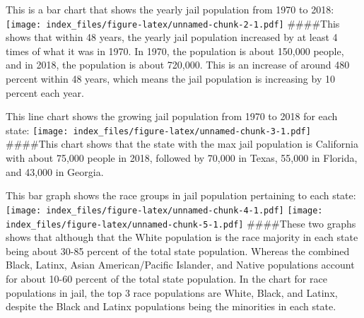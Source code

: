 \documentclass[
]{article}
\begin{document}
This is a bar chart that shows the yearly jail population from 1970 to
2018: \texttt{[image: index\_files/figure-latex/unnamed-chunk-2-1.pdf]}
\#\#\#\#This shows that within 48 years, the yearly jail population
increased by at least 4 times of what it was in 1970. In 1970, the
population is about 150,000 people, and in 2018, the population is about
720,000. This is an increase of around 480 percent within 48 years,
which means the jail population is increasing by 10 percent each year.

This line chart shows the growing jail population from 1970 to 2018 for
each state:
\texttt{[image: index\_files/figure-latex/unnamed-chunk-3-1.pdf]}
\#\#\#\#This chart shows that the state with the max jail population is
California with about 75,000 people in 2018, followed by 70,000 in
Texas, 55,000 in Florida, and 43,000 in Georgia.

This bar graph shows the race groups in jail population pertaining to
each state:
\texttt{[image: index\_files/figure-latex/unnamed-chunk-4-1.pdf]}
\texttt{[image: index\_files/figure-latex/unnamed-chunk-5-1.pdf]}
\#\#\#\#These two graphs shows that although that the White population
is the race majority in each state being about 30-85 percent of the
total state population. Whereas the combined Black, Latinx, Asian
American/Pacific Islander, and Native populations account for about
10-60 percent of the total state population. In the chart for race
populations in jail, the top 3 race populations are White, Black, and
Latinx, despite the Black and Latinx populations being the minorities in
each state.
\end{document}
